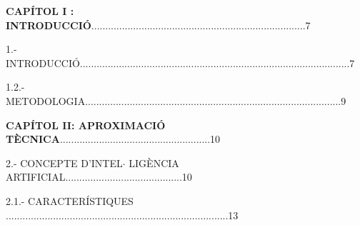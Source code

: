 \documentclass[12pt]{article}
\begin{document}
\vspace{\baselineskip}

\vspace{\baselineskip}
\begin{justify}
\textbf{CAPÍTOL I : INTRODUCCIÓ}.............................................................................7
\end{justify}\par


\vspace{\baselineskip}

\vspace{\baselineskip}
\begin{justify}
1.- INTRODUCCIÓ.................................................................................................7
\end{justify}\par


\vspace{\baselineskip}
\begin{justify}
1.2.- METODOLOGIA............................................................................................9
\end{justify}\par


\vspace{\baselineskip}

\vspace{\baselineskip}
\begin{justify}
\textbf{CAPÍTOL II: APROXIMACIÓ TÈCNICA}......................................................10
\end{justify}\par


\vspace{\baselineskip}

\vspace{\baselineskip}
\begin{justify}
2.- CONCEPTE D’INTEL$ \cdot $ LIGÈNCIA ARTIFICIAL..........................................10
\end{justify}\par


\vspace{\baselineskip}
\begin{justify}
2.1.- CARACTERÍSTIQUES ................................................................................13
\end{justify}\par
\end{document}
